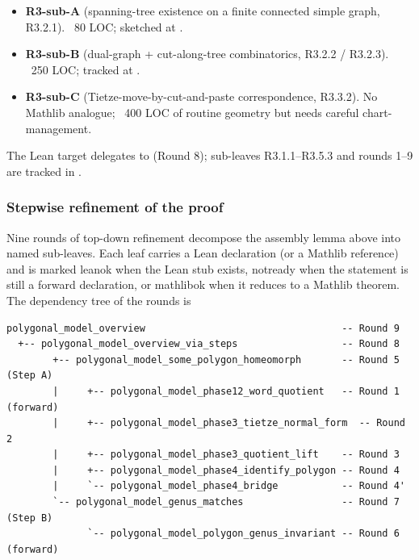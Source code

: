 \begin{itemize}
\item \textbf{R3-sub-A} (spanning-tree existence on a finite
  connected simple graph, R3.2.1).  ~80 LOC; sketched at
  .
\item \textbf{R3-sub-B} (dual-graph + cut-along-tree combinatorics,
  R3.2.2 / R3.2.3).  ~250 LOC; tracked at
  .
\item \textbf{R3-sub-C} (Tietze-move-by-cut-and-paste correspondence,
  R3.3.2).  No Mathlib analogue; ~400 LOC of routine geometry but
  needs careful chart-management.
\end{itemize}

\begin{lemma}
\label{lem:polygonal-model-overview-stepwise}
The Lean target
delegates to  (Round 8);
sub-leaves R3.1.1--R3.5.3 and rounds 1--9 are tracked in
.
\leanok
\end{lemma}


\subsubsection*{Stepwise refinement of the proof}

Nine rounds of top-down refinement decompose the assembly lemma
above into named sub-leaves.  Each leaf carries a Lean declaration
(or a Mathlib reference) and is marked \textsf{leanok} when the Lean
stub exists, \textsf{notready} when the statement is still a forward
declaration, or \textsf{mathlibok} when it reduces to a Mathlib
theorem.  The dependency tree of the rounds is

\begin{verbatim}
polygonal_model_overview                                  -- Round 9
  +-- polygonal_model_overview_via_steps                  -- Round 8
        +-- polygonal_model_some_polygon_homeomorph       -- Round 5 (Step A)
        |     +-- polygonal_model_phase12_word_quotient   -- Round 1 (forward)
        |     +-- polygonal_model_phase3_tietze_normal_form  -- Round 2
        |     +-- polygonal_model_phase3_quotient_lift    -- Round 3
        |     +-- polygonal_model_phase4_identify_polygon -- Round 4
        |     `-- polygonal_model_phase4_bridge           -- Round 4'
        `-- polygonal_model_genus_matches                 -- Round 7 (Step B)
              `-- polygonal_model_polygon_genus_invariant -- Round 6 (forward)
\end{verbatim}

